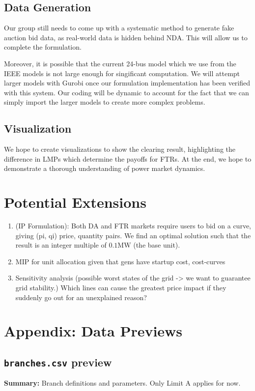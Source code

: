 \documentclass[11pt]{article}
\begin{document}
\subsection{Data Generation}
Our group still needs to come up with a systematic method to generate fake auction bid data, as real-world data is hidden behind NDA. This will allow us to complete the formulation.

Moreover, it is possible that the current 24-bus model which we use from the IEEE models is not large enough for singificant computation. We will attempt larger models with Gurobi once our formulation implementation has been verified with this system. Our coding will be dynamic to account for the fact that we can simply import the larger models to create more complex problems.

\subsection{Visualization}

We hope to create visualizations to show the clearing result, highlighting the difference in LMPs which determine the payoffs for FTRs. At the end, we hope to demonstrate a thorough understanding of power market dynamics.

\section{Potential Extensions}
\begin{enumerate}
    \item (IP Formulation): Both DA and FTR markets require users to bid on a curve, giving (pi, qi) price, quantity pairs. We find an optimal solution such that the result is an integer multiple of $0.1\text{MW}$ (the base unit).
    \item MIP for unit allocation given that gens have startup cost, cost-curves
    \item Sensitivity analysis (possible worst states of the grid -> we want to guarantee grid stability.) Which lines can cause the greatest price impact if they suddenly go out for an unexplained reason?
\end{enumerate}

\appendix
\newpage
\section{Appendix: Data Previews}

\subsection{\texttt{branches.csv} preview}\label{app:branches-preview}
\textbf{Summary:} Branch definitions and parameters. Only Limit A applies for now.
\end{document}
